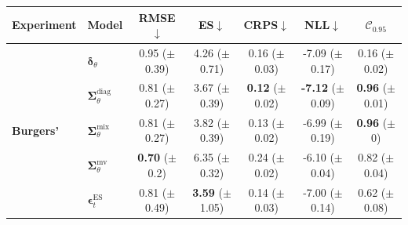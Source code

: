  \begin{tabular}{|l|l|ccccc|}
    \toprule
        Experiment & Model & RMSE$\downarrow$ & ES$\downarrow$ & CRPS$\downarrow$ & NLL$\downarrow$ & $\mathcal{C}_{0.95}$ \\
        \midrule
        \multirow{5}{*}{\textbf{Burgers'}}
        & $\bm\delta_\theta$ & \makecell{0.95 \\ ($\pm$ 0.39)} & \makecell{4.26 \\ ($\pm$ 0.71)} & \makecell{0.16 \\ ($\pm$ 0.03)} & \makecell{-7.09 \\ ($\pm$ 0.17)} & \makecell{0.16 \\ ($\pm$ 0.02)} \\
        & $\bm\Sigma_\theta^{\mathrm{diag}}$ & \makecell{0.81 \\ ($\pm$ 0.27)} & \makecell{3.67 \\ ($\pm$ 0.39)} & \makecell{\textbf{0.12} \\ ($\pm$ 0.02)} & \makecell{\textbf{-7.12} \\ ($\pm$ 0.09)} & \makecell{\textbf{0.96} \\ ($\pm$ 0.01)} \\
        & $\bm\Sigma_\theta^{\mathrm{mix}}$ & \makecell{0.81 \\ ($\pm$ 0.27)} & \makecell{3.82 \\ ($\pm$ 0.39)} & \makecell{0.13 \\ ($\pm$ 0.02)} & \makecell{-6.99 \\ ($\pm$ 0.19)} & \makecell{\textbf{0.96} \\ ($\pm$ 0)} \\
        & $\bm\Sigma_\theta^{\mathrm{mv}}$ & \makecell{\textbf{0.70} \\ ($\pm$ 0.2)} & \makecell{6.35 \\ ($\pm$ 0.32)} & \makecell{0.24 \\ ($\pm$ 0.02)} & \makecell{-6.10 \\ ($\pm$ 0.04)} & \makecell{0.82 \\ ($\pm$ 0.04)} \\
        & $\bm\epsilon_t^\mathrm{ES}$ & \makecell{0.81 \\ ($\pm$ 0.49)} & \makecell{\textbf{3.59} \\ ($\pm$ 1.05)} & \makecell{0.14 \\ ($\pm$ 0.03)} & \makecell{-7.00 \\ ($\pm$ 0.14)} & \makecell{0.62 \\ ($\pm$ 0.08)} \\

\end{tabular}
